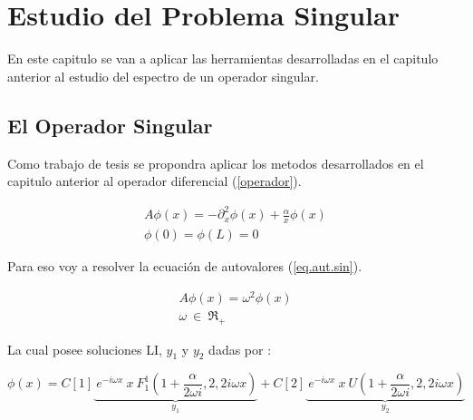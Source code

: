 \chapter{Estudio del Problema Singular}

En este capitulo se van a aplicar las herramientas desarrolladas en el capitulo anterior al estudio del espectro de un operador singular.

\section{El Operador Singular}

Como trabajo de tesis se propondra aplicar los metodos desarrollados en el capitulo anterior al operador diferencial (\ref{operador}).

\begin{equation}
\begin{array}{c}
    A \phi (x) = - \partial ^2 _x  \phi(x) + \frac{\alpha}{x} \phi(x) \\
    \phi(0) = \phi(L) = 0 
\end{array}
\label{operador}
\end{equation}

Para eso voy a resolver la ecuación de autovalores (\ref{eq.aut.sin}).

\begin{equation}
\begin{array}{c}
    A  \phi (x)  =   \omega ^2 \phi (x) \\ 
    \omega \ \in \ \mathfrak{R} _+
\end{array}
\label{eq.aut.sin}
\end{equation}




La cual posee soluciones LI, $ y_1 $ y $ y_2 $ dadas por :

\begin{equation}
    \phi (x) = 
    C[1]
    \underbrace{
     \ e ^{-i \omega x} \ x \ F _{1} ^{1} (1+\frac{ \alpha}{2 \omega i },2,2 i \omega x) } _ {y_1}
    + C[2] \underbrace{ \ e^{-i \omega x } \ x \ U (1+\frac{ \alpha}{2 \omega i },2,2 i \omega x) } _{y_2} 
\end{equation}




